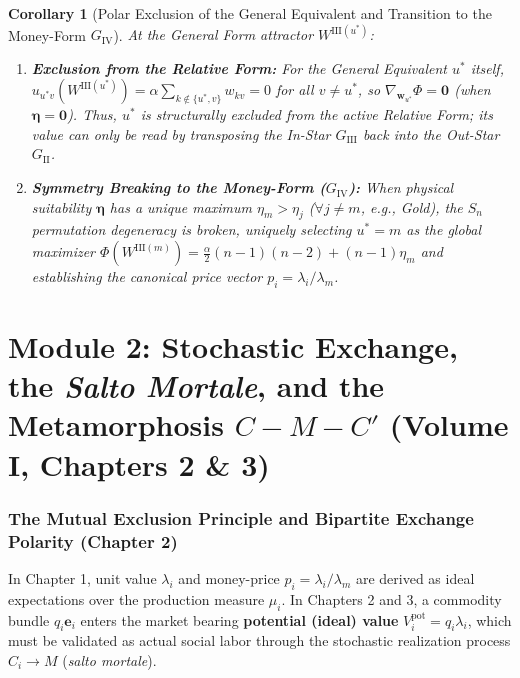 \documentclass[11pt,a4paper]{article}
\newtheorem{corollary}{Corollary}[section]
\begin{document}
\begin{corollary}[Polar Exclusion of the General Equivalent and Transition to the Money-Form $G_{\text{IV}}$]
At the General Form attractor $W^{\text{III}(u^*)}$:
\begin{enumerate}[label=(\roman*)]
    \item \textbf{Exclusion from the Relative Form:} For the General Equivalent $u^*$ itself, $u_{u^* v}(W^{\text{III}(u^*)}) = \alpha \sum_{k \notin \{u^*, v\}} w_{kv} = 0$ for all $v \neq u^*$, so $\nabla_{\mathbf{w}_{u^*}} \Phi = \mathbf{0}$ (when $\boldsymbol{\eta} = \mathbf{0}$). Thus, $u^*$ is structurally excluded from the active Relative Form; its value can only be read by transposing the In-Star $G_{\text{III}}$ back into the Out-Star $G_{\text{II}}$.
    \item \textbf{Symmetry Breaking to the Money-Form ($G_{\text{IV}}$):} When physical suitability $\boldsymbol{\eta}$ has a unique maximum $\eta_m > \eta_j$ ($\forall j \neq m$, e.g., Gold), the $S_n$ permutation degeneracy is broken, uniquely selecting $u^* = m$ as the global maximizer $\Phi(W^{\text{III}(m)}) = \frac{\alpha}{2}(n-1)(n-2) + (n-1)\eta_m$ and establishing the canonical price vector $p_i = \lambda_i / \lambda_m$.
\end{enumerate}
\end{corollary}

\newpage

\part{Module 2: Stochastic Exchange, the \textit{Salto Mortale}, and the Metamorphosis $C - M - C'$ (Volume I, Chapters 2 \& 3)}

\section{The Mutual Exclusion Principle and Bipartite Exchange Polarity (Chapter 2)}

In Chapter 1, unit value $\lambda_i$ and money-price $p_i = \lambda_i / \lambda_m$ are derived as ideal expectations over the production measure $\mu_i$. In Chapters 2 and 3, a commodity bundle $q_i \mathbf{e}_i$ enters the market bearing \textbf{potential (ideal) value} $V^{\text{pot}}_i = q_i \lambda_i$, which must be validated as actual social labor through the stochastic realization process $C_i \to M$ (\textit{salto mortale}).
\end{document}
